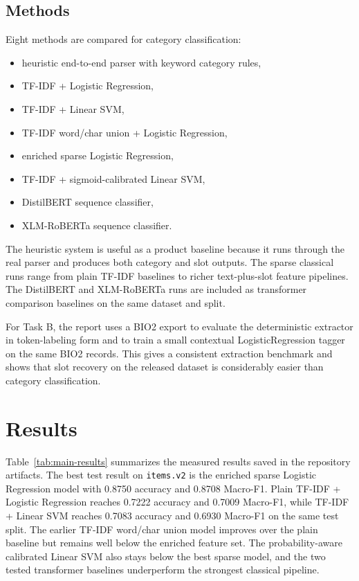 \documentclass{article}
\begin{document}
\subsection{Methods}

Eight methods are compared for category classification:
\begin{itemize}
  \item heuristic end-to-end parser with keyword category rules,
  \item TF-IDF + Logistic Regression,
  \item TF-IDF + Linear SVM,
  \item TF-IDF word/char union + Logistic Regression,
  \item enriched sparse Logistic Regression,
  \item TF-IDF + sigmoid-calibrated Linear SVM,
  \item DistilBERT sequence classifier,
  \item XLM-RoBERTa sequence classifier.
\end{itemize}

The heuristic system is useful as a product baseline because it runs through
the real parser and produces both category and slot outputs. The sparse
classical runs range from plain TF-IDF baselines to richer text-plus-slot
feature pipelines. The DistilBERT and XLM-RoBERTa runs are included as
transformer comparison baselines on the same dataset and split.

For Task B, the report uses a BIO2 export to evaluate the deterministic
extractor in token-labeling form and to train a small contextual
LogisticRegression tagger on the same BIO2 records. This gives a consistent
extraction benchmark and shows that slot recovery on the released dataset is
considerably easier than category classification.

\section{Results}

Table~\ref{tab:main-results} summarizes the measured results saved in the
repository artifacts. The best test result on
\texttt{items.v2} is the enriched sparse Logistic Regression model with 0.8750
accuracy and 0.8708 Macro-F1. Plain TF-IDF + Logistic Regression reaches
0.7222 accuracy and 0.7009 Macro-F1, while TF-IDF + Linear SVM reaches 0.7083
accuracy and 0.6930 Macro-F1 on the same test split. The earlier TF-IDF
word/char union model improves over the plain baseline but remains well below
the enriched feature set. The probability-aware calibrated Linear SVM also
stays below the best sparse model, and the two tested transformer baselines
underperform the strongest classical pipeline.
\end{document}
